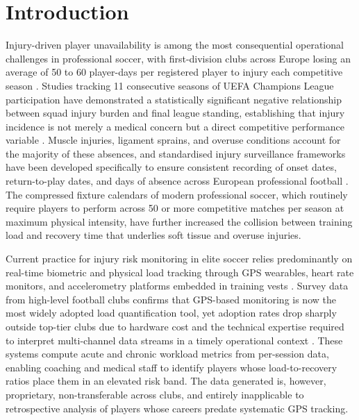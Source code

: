 \documentclass[conference]{IEEEtran}
\begin{document}
\section{Introduction}
Injury-driven player unavailability is among the most consequential operational challenges in professional soccer, with first-division clubs across Europe losing an average of 50 to 60 player-days per registered player to injury each competitive season \cite{ekstrand2011injury}. Studies tracking 11 consecutive seasons of UEFA Champions League participation have demonstrated a statistically significant negative relationship between squad injury burden and final league standing, establishing that injury incidence is not merely a medical concern but a direct competitive performance variable \cite{hagglund2013injuries}. Muscle injuries, ligament sprains, and overuse conditions account for the majority of these absences, and standardised injury surveillance frameworks have been developed specifically to ensure consistent recording of onset dates, return-to-play dates, and days of absence across European professional football \cite{fuller2006consensus}. The compressed fixture calendars of modern professional soccer, which routinely require players to perform across 50 or more competitive matches per season at maximum physical intensity, have further increased the collision between training load and recovery time that underlies soft tissue and overuse injuries.

Current practice for injury risk monitoring in elite soccer relies predominantly on real-time biometric and physical load tracking through GPS wearables, heart rate monitors, and accelerometry platforms embedded in training vests \cite{gabbett2016training}. Survey data from high-level football clubs confirms that GPS-based monitoring is now the most widely adopted load quantification tool, yet adoption rates drop sharply outside top-tier clubs due to hardware cost and the technical expertise required to interpret multi-channel data streams in a timely operational context \cite{akenhead2016training}. These systems compute acute and chronic workload metrics from per-session data, enabling coaching and medical staff to identify players whose load-to-recovery ratios place them in an elevated risk band. The data generated is, however, proprietary, non-transferable across clubs, and entirely inapplicable to retrospective analysis of players whose careers predate systematic GPS tracking.
\end{document}
